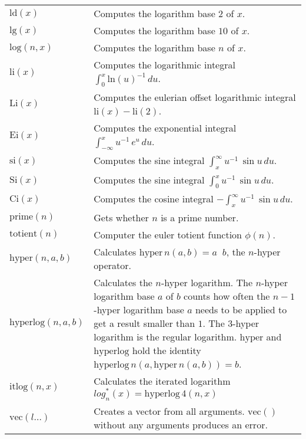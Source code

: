 \documentclass[10pt]{article}
\newcommand{\tabgap}{\vspace{3mm}\\}
\begin{document}
\begin{longtable}{p{}p{}}
        $ \mathrm{ld}(x) $                         & Computes the logarithm base $ 2 $ of $ x $. \\
        $ \mathrm{lg}(x) $                         & Computes the logarithm base $ 10 $ of $ x $. \\
        $ \mathrm{log}(n, x) $                     & Computes the logarithm base $ n $ of $ x $. \tabgap
        $ \mathrm{li}(x) $                         & Computes the logarithmic integral $ \int_0^x \mathrm{ln}(u)^{-1}\,du $. \\
        $ \mathrm{Li}(x) $                         & Computes the eulerian offset logarithmic integral $ \mathrm{li}(x) - \mathrm{li}(2) $. \\
        $ \mathrm{Ei}(x) $                         & Computes the exponential integral $ \int_{-\infty}^x u^{-1}\,e^u\,du $. \\
        $ \mathrm{si}(x) $                         & Computes the sine integral $ \int_x^{\infty} u^{-1}\,\sin u\,du $. \\
        $ \mathrm{Si}(x) $                         & Computes the sine integral $ \int_0^x u^{-1}\,\sin u\,du $. \\
        $ \mathrm{Ci}(x) $                         & Computes the cosine integral $ -\int_x^{\infty} u^{-1}\,\sin u\,du $. \\
        $ \mathrm{prime}(n) $                      & Gets whether $ n $ is a prime number. \\
        $ \mathrm{totient}(n) $                    & Computer the euler totient function $ \phi(n) $. \tabgap
        $ \mathrm{hyper}(n, a, b) $                & Calculates $ \mathrm{hyper}\,n(a, b) = a \mathop{\uparrow^{(n-2)}} b $, the $ n $-hyper operator. \\
        $ \mathrm{hyperlog}(n, a, b) $             & Calculates the $ n $-hyper logarithm.
                                                     The $ n $-hyper logarithm base $ a $ of $ b $ counts how often the $ n - 1 $-hyper logarithm base $ a $ needs to be applied to get a result smaller than $ 1 $.
                                                     The $ 3 $-hyper logarithm is the regular logarithm.
                                                     $ \mathrm{hyper} $ and $ \mathrm{hyperlog} $ hold the identity $ \mathrm{hyperlog}\,n(a, \mathrm{hyper}\,n(a, b)) = b $. \\
        $ \mathrm{itlog}(n, x) $                   & Calculates the iterated logarithm $ log^{*}_n(x) = \mathrm{hyperlog}\,4(n, x) $ \tabgap
        $ \mathrm{vec}(l\dots) $                   & Creates a vector from all arguments. $ \mathrm{vec}() $ without any arguments produces an error. \\

\end{longtable}
\end{document}
